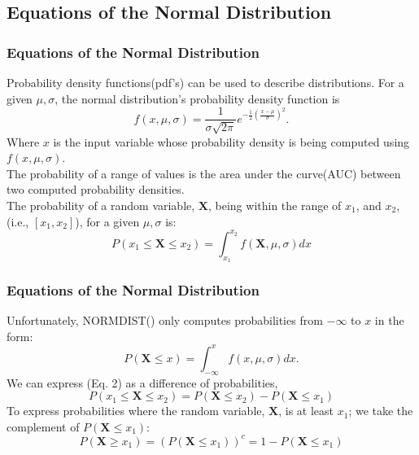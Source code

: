 \documentclass[12pt]{beamer}
\begin{document}
\subsection{Equations of the Normal Distribution}
	\begin{frame}
		\frametitle{Equations of the Normal Distribution}
		Probability density functions(pdf's) can be used to describe distributions.
		For a given $\mu, \sigma$, the normal distribution's probability density function is \begin{equation} 
			f(x,\mu,\sigma)= \frac{1}{\sigma\sqrt{2\pi}}e^{-\frac{1}{2}\left(\frac{x-\mu}{\sigma}\right)^2}. 
			\end{equation}
		Where $x$ is the input variable whose probability density is being computed using $f(x,\mu,\sigma)$. \\
		The probability of a range of values is the area under the curve(AUC) between two computed probability densities.\\ The probability of a random variable, $\textbf{X}$, being within the range of $x_{1}$, and $x_{2}$, (i.e., $[x_1,x_2]$), for a given $\mu, \sigma$ is:
		\begin{equation}
		 P(x_{1} \leq \textbf{X} \leq x_{2}) 
		= \int_{x_{1}}^{x_{2}} f(\textbf{X}, \mu, \sigma)dx 
		\end{equation}
	\end{frame}
	\begin{frame}
	\frametitle{Equations of the Normal Distribution}
	Unfortunately, NORMDIST() only computes probabilities from $-\infty$ to $x$ in the form:
	\begin{equation}
		P(\textbf{X}\leq x) =  \int_{-\infty}^{x} f(x, \mu, \sigma)dx.
	\end{equation}
	We can express (Eq. 2) as a difference of probabilities,
	\begin{equation}
		P(x_1 \leq \textbf{X} \leq x_2 ) = P(\textbf{X}\leq x_2) - P(\textbf{X} \leq x_1)
	\end{equation}
	To express probabilities where the random variable, $\textbf{X}$, is at least $x_1$; we take the complement of $P(\textbf{X}\leq x_1)$:
	\begin{equation}
		P(\textbf{X}\geq x_1) = (P(\textbf{X}\leq x_1))^c = 1-P(\textbf{X}\leq x_1)
	\end{equation}
\end{frame}
\end{document}

